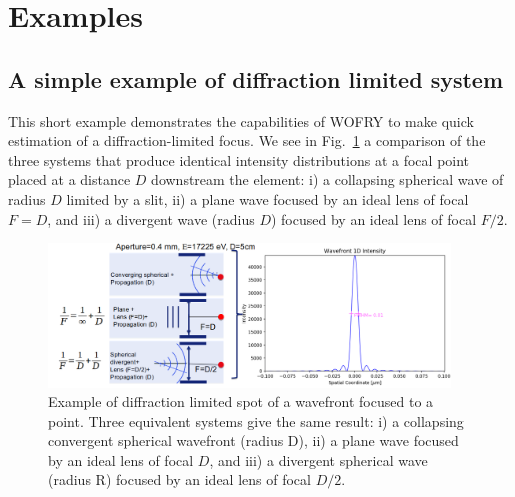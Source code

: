 \documentclass{iopconfser}
\begin{document}


\section{Examples}

\subsection{A simple example of diffraction limited system}
This short example demonstrates the capabilities of WOFRY to make quick estimation of a diffraction-limited focus. We see in Fig.~\ref{fig:diffractionlimited} a comparison of the three systems that produce identical intensity distributions at a focal point placed at a distance $D$ downstream the element: i) a collapsing spherical wave of radius $D$ limited by a slit, ii) a plane wave focused by an ideal lens of focal $F=D$, and iii) a divergent wave (radius $D$) focused by an ideal lens of focal $F/2$.

\begin{figure}[H]
    \centering
    \includegraphics[width=0.95\textwidth]{figures/diffractionlimited.png}
    \caption{Example of diffraction limited spot of a wavefront focused to a point. Three equivalent systems give the same result: i) a collapsing convergent spherical wavefront (radius D), ii) a plane wave focused by an ideal lens of focal $D$, and iii) a divergent spherical wave (radius R) focused by an ideal lens of focal $D/2$.   }\label{fig:diffractionlimited}
\end{figure}
\end{document}
